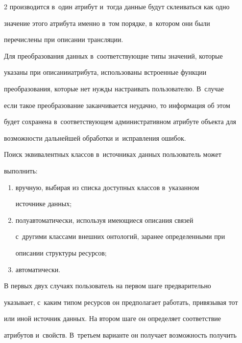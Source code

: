 \begin{multicols}{2}
производится в~один атрибут и~тогда данные будут склеиваться как одно 

значение этого атрибута именно в~том порядке, в~котором они были 

перечислены при описании трансляции.

    

    Для преобразования данных в~соответствующие типы значений, которые 

указаны при описании\linebreak атрибута, использованы встроенные функции 

пре\-об\-ра\-зо\-ва\-ния, которые нет нужды настраивать пользователю. В~случае 

если такое преобразование заканчивается неудачно, то информация об этом\linebreak 

будет сохранена в~соответствующем административном атрибуте объекта для 

возможности дальнейшей обработки и~исправления ошибок.

    

    Поиск эквивалентных классов в~источниках данных пользователь может 

выполнить: 

    \begin{enumerate}[(1)]

\item вручную, выбирая из списка доступных классов в~указанном 

источнике данных;

\item полуавтоматически, используя имеющиеся описания связей 

с~другими классами внешних онтологий, заранее определенными при 

описании структуры ресурсов;

\item автоматически. 

\end{enumerate}



    В первых двух случаях пользователь на первом шаге предварительно 

указывает, с~каким типом ресурсов он предполагает работать, привязывая тот 

или иной источник данных. На втором шаге он определяет соответствие 

атрибутов и~свойств. В~треть\-ем варианте он получает возможность получить 


\end{multicols}
